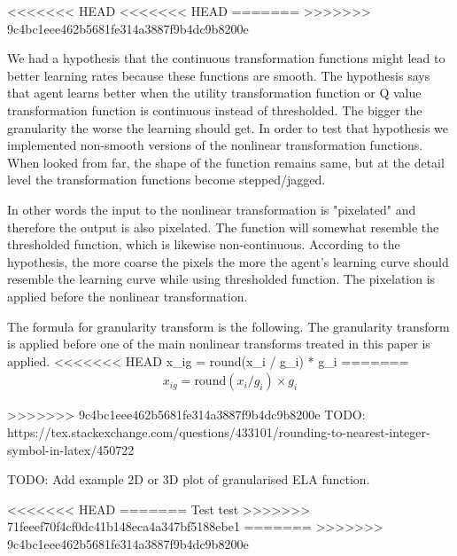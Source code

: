 
<<<<<<< HEAD
<<<<<<< HEAD
=======
>>>>>>> 9c4bc1eee462b5681fe314a3887f9b4dc9b8200e

We had a hypothesis that the continuous transformation functions might lead to better learning rates because these functions are smooth. The hypothesis says that agent learns better when the utility transformation function or Q value transformation function is continuous instead of thresholded. The bigger the granularity the worse the learning should get. In order to test that hypothesis we implemented non-smooth versions of the nonlinear transformation functions. When looked from far, the shape of the function remains same, but at the detail level the transformation functions become stepped/jagged.

In other words the input to the nonlinear transformation is "pixelated" and therefore the output is also pixelated. The function will somewhat resemble the thresholded function, which is likewise non-continuous. According to the hypothesis, the more coarse the pixels the more the agent's learning curve should resemble the learning curve while using thresholded function. The pixelation is applied before the nonlinear transformation.

The formula for granularity transform is the following. The granularity transform is applied before one of the main nonlinear transforms treated in this paper is applied.
<<<<<<< HEAD
x_ig = round(x_i / g_i) * g_i
=======
\begin{align}
x_{ig} = \text{round}(x_i / g_i) \times g_i
\end{align}

>>>>>>> 9c4bc1eee462b5681fe314a3887f9b4dc9b8200e
TODO: https://tex.stackexchange.com/questions/433101/rounding-to-nearest-integer-symbol-in-latex/450722

TODO: Add example 2D or 3D plot of granularised ELA function.



<<<<<<< HEAD
=======
Test test
>>>>>>> 71feeef70f4cf0dc41b148eca4a347bf5188ebe1
=======
>>>>>>> 9c4bc1eee462b5681fe314a3887f9b4dc9b8200e
